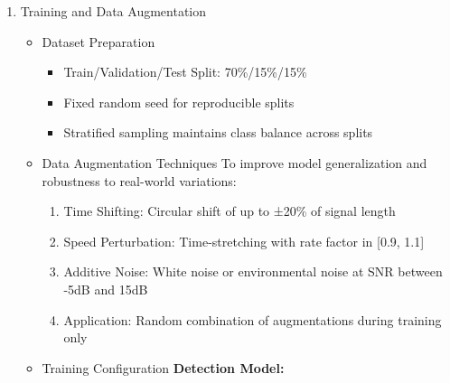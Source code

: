 \documentclass[conference]{IEEEtran}
\begin{document}
\begin{enumerate}
\begin{itemize}
\begin{enumerate}
                            \item Stage 1: Pass features through detection CNN 
                            \item If detection confidence >= 0.7: Flag as cough event 
                            \item Stage 2: Pass same features through classification CNN-LSTM 
                            \item Extract cough type/category and confidence score 
                            \item Log detection with timestamp, confidence, and classification
                        \end{enumerate}
                \end{itemize}
            \item Training and Data Augmentation
                \begin{itemize}
                    \item Dataset Preparation
                        \begin{itemize} 
                            \item Train/Validation/Test Split: 70\%/15\%/15\% 
                            \item Fixed random seed for reproducible splits 
                            \item Stratified sampling maintains class balance across splits 
                        \end{itemize}
                    \item Data Augmentation Techniques
                        To improve model generalization and robustness to real-world variations: 
                        \begin{enumerate} 
                            \item Time Shifting: Circular shift of up to ±20\% of signal length 
                            \item Speed Perturbation: Time-stretching with rate factor in [0.9, 1.1] 
                            \item Additive Noise: White noise or environmental noise at SNR between -5dB and 15dB 
                            \item Application: Random combination of augmentations during training only 
                        \end{enumerate}
                    \item Training Configuration
                        \textbf{Detection Model:} 

\end{itemize}
\end{enumerate}
\end{document}
